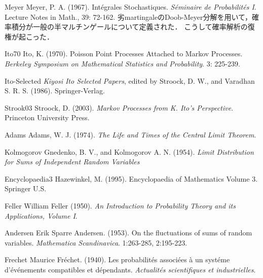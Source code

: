 \documentclass[uplatex,dvipdfmx]{jsreport}
\begin{document}
\begin{thebibliography}{99}
    \item{Meyer}
    Meyer, P. A. (1967). Intégrales Stochastiques. \textit{Séminaire de Probabilités I}. Lecture Notes in Math., 39: 72-162. 劣martingaleのDoob-Meyer分解を用いて，確率積分が一般の半マルチンゲールについて定義された．
    こうして確率解析の復権が起こった．
    \item{Ito70}
    Ito, K. (1970). Poisson Point Processes Attached to Markov Processes. \textit{Berkeley Symposium on Mathematical Statistics and Probability}. 3: 225-239.
    \item{Ito-Selected}
    \textit{Kiyosi Ito Selected Papers}, edited by Stroock, D. W., and Varadhan S. R. S. (1986). Springer-Verlag.
    \item{Strook03}
    Stroock, D. (2003). \textit{Markov Processes from K. Ito's Perspective}. Princeton University Press.
    
    \item{Adams}
    Adams, W. J. (1974). \textit{The Life and Times of the  Central Limit Theorem}.
    \item{Kolmogorov}
    Gnedenko, B. V., and Kolmogorov A. N. (1954). \textit{Limit Distribution for Sums of Independent Random Variables}
    \item{Encyclopaedia3}
    Hazewinkel, M. (1995). Encyclopaedia of Mathematics Volume 3. Springer U.S.
    \item{Feller}
    William Feller (1950). \textit{An Introduction to Probability Theory and its Applications, Volume I}.
    \item{Andersen}
    Erik Sparre Andersen. (1953). On the fluctuations of sums of random variables. \textit{Mathematica Scandinavica}. 1:263-285, 2:195-223.
    \item{Frechet}
    Maurice Fréchet. (1940). Les probabilités associées à un systéme d'événements compatibles et dépendants. \textit{Actualités scientifiques et industrielles}.
\end{thebibliography}
\end{document}
